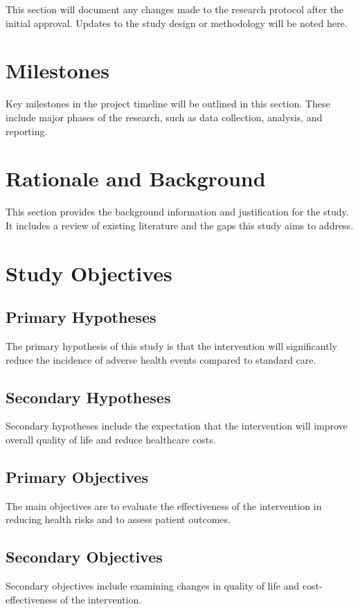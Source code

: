 \documentclass[12pt]{article}
\begin{document}
This section will document any changes made to the research protocol after the initial approval. Updates to the study design or methodology will be noted here.

\section{Milestones}
\label{milestones}

Key milestones in the project timeline will be outlined in this section. These include major phases of the research, such as data collection, analysis, and reporting.

\section{Rationale and Background}
\label{rationale-and-background}

This section provides the background information and justification for the study. It includes a review of existing literature and the gaps this study aims to address.

\section{Study Objectives}
\label{study-objectives}

\subsection{Primary Hypotheses}
The primary hypothesis of this study is that the intervention will significantly reduce the incidence of adverse health events compared to standard care.

\subsection{Secondary Hypotheses}
Secondary hypotheses include the expectation that the intervention will improve overall quality of life and reduce healthcare costs.

\subsection{Primary Objectives}
The main objectives are to evaluate the effectiveness of the intervention in reducing health risks and to assess patient outcomes.

\subsection{Secondary Objectives}
Secondary objectives include examining changes in quality of life and cost-effectiveness of the intervention.
\end{document}
